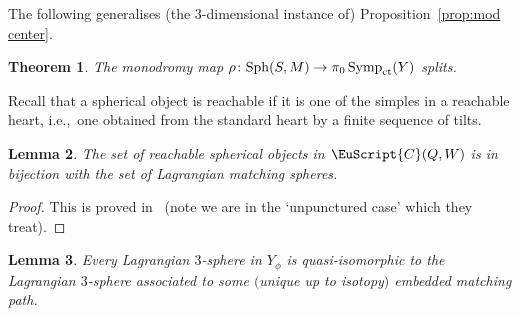 \documentclass[pdftex]{sigma}
\newcommand{\scrC}{\EuScript{C}}
\DeclareMathOperator{\Symp}{Symp}
\newtheorem{thm}{Theorem}[section]
\newtheorem{lem}[thm]{Lemma}
\theoremstyle{definition}
\numberwithin{equation}{section}
\begin{document}
The following generalises (the 3-dimensional instance of) Proposition~\ref{prop:mod center}.

\begin{thm} \label{thm:bordered surface case}
The monodromy map $\rho\colon \mathrm{Sph}(S,M) \to \pi_0\Symp_{\rm ct}(Y)$ splits.
\end{thm}

Recall that a spherical object is reachable if it is one of the simples in a reachable heart, i.e.,~one obtained from the standard heart by a finite sequence of tilts.

\begin{lem}
The set of reachable spherical objects in $\scrC(Q,W)$ is in bijection with the set of Lagrangian matching spheres.
\end{lem}

\begin{proof} This is proved in~\cite{King-QiuYu} (note we are in the `unpunctured case' which they treat). \end{proof}

\begin{lem} \label{lem:quis to matching}
Every Lagrangian $3$-sphere in $Y_{\phi}$ is quasi-isomorphic to the Lagrangian $3$-sphere associated to some $($unique up to isotopy$)$ embedded matching path.
\end{lem}
\end{document}
